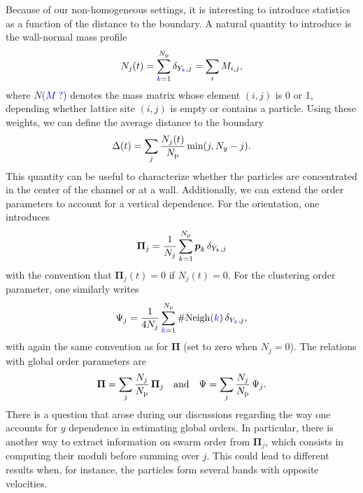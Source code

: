 \documentclass[aps,prl,twocolumn,amsmath,amssymb,superscriptaddress]{revtex4-1}
\newcommand{\CC}[1]
{\textcolor{blue}{#1}}
\begin{document}
Because of our non-homogeneous settings, it is interesting to introduce statistics as a function of the distance to the boundary. A natural quantity to introduce is the wall-normal mass profile
\begin{equation}
N_j(t) = \sum_{\CC{k} = 1}^{N_{\rm p}} \delta_{Y_{\CC{k}},j} = \sum_i M_{i,j},
\end{equation}
where $N$\CC{($M$ ?)} denotes the mass matrix whose element $(i,j)$ is 0 or 1, depending whether lattice site $(i,j)$ is empty or contains a particle. Using these weights, we can define the average distance to the boundary
\begin{equation}
  \Delta(t) = \sum_j \frac{N_j(t)}{N_{\rm p}} \min(j,N_y-j).
\end{equation}
This quantity can be useful to characterize whether the particles are concentrated in the center of the channel or at a wall.  Additionally, we can extend the order parameters to account for a vertical dependence. For the orientation, one introduces
\begin{equation}
  \boldsymbol{\Pi}_j = \frac{1}{N_j} \sum_{k=1}^{N_{\rm p}} \boldsymbol{p}_{k}\,\delta_{Y_{k},j}
\end{equation}
with the convention that $\boldsymbol{\Pi}_j(t) = 0$ if $N_j(t)=0$. For the clustering order parameter, one similarly writes
\begin{equation}
  \Psi_j =  \frac{1}{4N_j}\sum_{\CC{k}=1}^{N_{\rm p}} \# {\rm Neigh}(\CC{k})\,\delta_{Y_{\CC{k}},j},
\end{equation}
with again the same convention as for $\boldsymbol{\Pi}$ (set to zero when $N_j=0$). The relations with global order parameters are
\begin{equation}
  \boldsymbol{\Pi} = \sum_j \frac{N_j}{N_{\rm p}}\,\boldsymbol{\Pi}_j \quad\text{and}\quad \Psi = \sum_j \frac{N_j}{N_{\rm p}}\,\Psi_j.
\end{equation}
There is a question that arose during our discussions regarding the way one accounts for $y$ dependence in estimating global orders. In particular, there is another way to extract information on swarm order from $\boldsymbol{\Pi}_j$, which consists in computing their moduli before summing over $j$. This could lead to different results when, for instance, the particles form several bands with opposite velocities.
\end{document}
